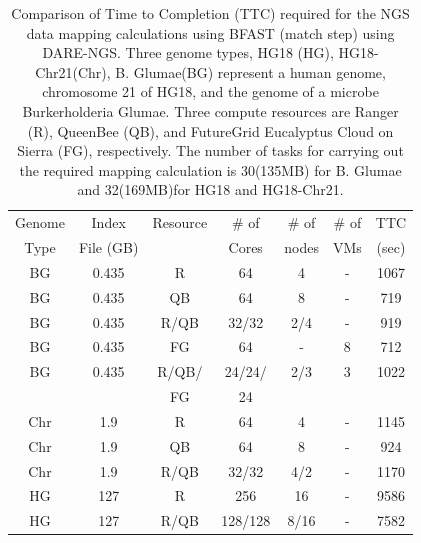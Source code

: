 \documentclass[]{svjour3}
\begin{document}
 \begin{table}
\centering
\scriptsize
 \begin{tabular}{|c|c|c|c|c|c|c|} 
 \hline 
Genome & Index         & Resource    & \# of & \# of &   \# of         &	TTC  \\
  Type               & File (GB)        & &Cores &   nodes &  VMs&  (sec)\\  
  \hline
 BG &0.435& R&	64 &4&-	&1067 \\
\hline                  
BG &0.435& QB	&	64& 8&-	&719 \\
\hline
 BG &0.435&R/QB	&	32/32 &2/4& -&919 \\
\hline
 BG &0.435& FG &	64 &-&8	&712 \\
\hline
 BG &0.435 &  R/QB/ &	24/24/& 2/3 & 3 &1022\\
 & & FG& 24 &&&\\
\hline
\hline
Chr &1.9& R	&	64& 4 &-&1145 \\
\hline
Chr &1.9& QB	&	64&8&-	&924 \\
\hline
Chr &1.9& R/QB	&	32/32& 4/2&	-&1170 \\
\hline
\hline
HG &127& R	&	256 & 16 &-	&9586\\
\hline
HG &127& R/QB	&	128/128&8/16 & -&7582 \\
\hline
\end{tabular}
\caption{
  Comparison of Time to Completion (TTC) required for the NGS data
  mapping calculations using BFAST (match step) using DARE-NGS. 
  Three genome types,
  HG18 (HG), HG18-Chr21(Chr), B. Glumae(BG) represent a human genome,
  chromosome 21 of HG18, and the genome of a microbe Burkerholderia
  Glumae. Three compute resources are Ranger (R), QueenBee (QB), and
  FutureGrid  Eucalyptus Cloud on Sierra (FG), respectively. The
  number of tasks for carrying out the required mapping calculation is
  30(135MB) for B. Glumae and 32(169MB)for HG18 and HG18-Chr21.
}

  \label{table:NGS-Distributed} 
\end{table}
\end{document}
